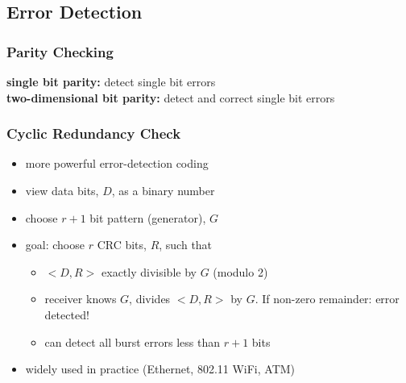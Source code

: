 \subsection{Error Detection}
\subsubsection{Parity Checking}
\textbf{single bit parity:} detect single bit errors\\
\textbf{two-dimensional bit parity:} detect and correct single bit errors
\subsubsection{Cyclic Redundancy Check}
\begin{itemize}
	\item more powerful error-detection coding
	\item view data bits, $D$, as a binary number
	\item choose $r+1$ bit pattern (generator), $G$
	\item goal: choose $r$ CRC bits, $R$, such that
	\begin{itemize}
		\item $<D,R>$ exactly divisible by $G$ (modulo 2)
		\item receiver knows $G$, divides $<D,R>$ by $G$. If non-zero remainder: error detected!
		\item can detect all burst errors less than $r+1$ bits
	\end{itemize}
	\item widely used in practice (Ethernet, 802.11 WiFi, ATM)
\end{itemize}

